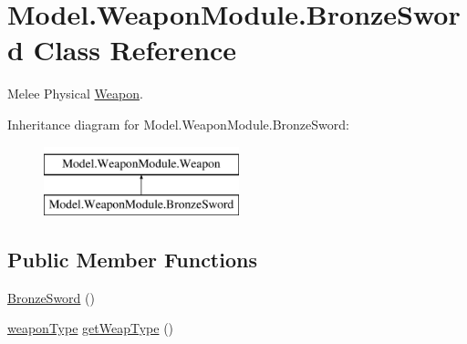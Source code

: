 \hypertarget{class_model_1_1_weapon_module_1_1_bronze_sword}{}\section{Model.\+Weapon\+Module.\+Bronze\+Sword Class Reference}
\label{class_model_1_1_weapon_module_1_1_bronze_sword}


Melee Physical \hyperlink{interface_model_1_1_weapon_module_1_1_weapon}{Weapon}.  


Inheritance diagram for Model.\+Weapon\+Module.\+Bronze\+Sword\+:\begin{figure}[H]
\begin{center}
\leavevmode
\includegraphics[height=2.000000cm]{class_model_1_1_weapon_module_1_1_bronze_sword}
\end{center}
\end{figure}
\subsection*{Public Member Functions}
\begin{DoxyCompactItemize}
\item 
\hyperlink{class_model_1_1_weapon_module_1_1_bronze_sword_afca5f581369ec99d88d3dafa9be47e59}{Bronze\+Sword} ()
\item 
\hyperlink{namespace_model_1_1_weapon_module_a3390c266f89e3399c2bc7fa31f13cbec}{weapon\+Type} \hyperlink{class_model_1_1_weapon_module_1_1_bronze_sword_a3b8efec8bd8cfe293f0bf96dc024a46a}{get\+Weap\+Type} ()
\end{DoxyCompactItemize}
